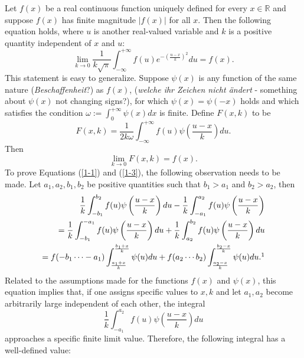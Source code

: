 \documentclass{article}
\begin{document}
Let $f(x)$ be a real continuous function uniquely defined for every $x\in\mathbb{R}$ and suppose $f(x)$ has finite magnitude $|f(x)|$ for all $x$. Then the following equation holds, where $u$ is another real-valued variable and $k$ is a positive quantity independent of $x$ and $u$:
\begin{equation}\label{1-1}
\lim_{k\rightarrow 0}\frac{1}{k\sqrt{\pi}}\int_{-\infty}^{+\infty}f(u) e^{-(\frac{u-x}{k})^2}du = f(x).
\end{equation}
This statement is easy to generalize. Suppose $\psi(x)$ is any function of the same nature (\textit{Beschaffenheit}?) as $f(x)$, (\textit{welche ihr Zeichen nicht \"{a}ndert} - something about $\psi(x)$ not changing signs?), for which $\psi(x)=\psi(-x)$ holds and which satisfies the condition $\omega:=\int_0^{+\infty} \psi(x)dx$ is finite. Define $F(x,k)$ to be
\begin{equation}
F(x,k)=\frac{1}{2k\omega}\int_{-\infty}^{+\infty} f(u)\psi\left(\frac{u-x}{k}\right)du.
\end{equation}
Then 
\begin{equation}\label{1-3}
\lim_{k\rightarrow 0}F(x,k)=f(x).
\end{equation}
To prove Equations (\ref{1-1}) and (\ref{1-3}), the following observation needs to be made. Let $a_1,a_2,b_1,b_2$ be positive quantities such that $b_1>a_1$ and $b_2>a_2$, then
\begin{align*}
\frac{1}{k}\int_{-b_1}^{b_2}f(u)\psi\left(\frac{u-x}{k}\right)du-\frac{1}{k}\int_{-a_1}^{a_2}f(u)\psi\left(\frac{u-x}{k}\right)\\
=\frac{1}{k}\int_{-b_1}^{-a_1}f(u)\psi\left(\frac{u-x}{k}\right)du+\frac{1}{k}\int_{a_2}^{b_2}f(u)\psi\left(\frac{u-x}{k}\right)du\\
=f(-b_1\cdots -a_1)\int_{\frac{a_1+x}{k}}^{\frac{b_1+x}{k}}\psi(u)du + f(a_2\cdots b_2)\int_{\frac{a_2-x}{k}}^{\frac{b_2-x}{k}} \psi(u) du.\footnotemark
\end{align*}
Related to the assumptions made for the functions $f(x)$ and $\psi(x)$, this equation implies that, if one assigns specific values to $x,k$ and let $a_1,a_2$ become arbitrarily large independent of each other, the integral
\begin{equation*}
\frac{1}{k}\int_{-a_1}^{a_2} f(u)\psi\left(\frac{u-x}{k}\right)du
\end{equation*}
approaches a specific finite limit value. Therefore, the following integral has a well-defined value:
\end{document}

